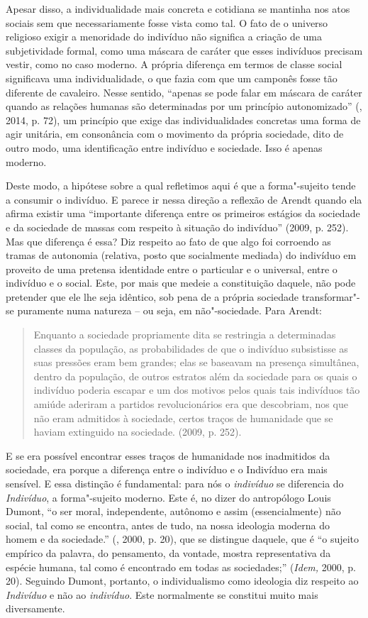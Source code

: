 Apesar disso, a individualidade mais concreta e cotidiana se mantinha
nos atos sociais sem que necessariamente fosse vista como tal. O fato de
o universo religioso exigir a menoridade do indivíduo não significa a
criação de uma subjetividade formal, como uma máscara de caráter que
esses indivíduos precisam vestir, como no caso moderno. A própria
diferença em termos de classe social significava uma individualidade, o
que fazia com que um camponês fosse tão diferente de cavaleiro. Nesse
sentido, ``apenas se pode falar em máscara de caráter quando as relações
humanas são determinadas por um princípio autonomizado'' (, 2014, p.
72), um princípio que exige das individualidades concretas uma forma de
agir unitária, em consonância com o movimento da própria sociedade, dito
de outro modo, uma identificação entre indivíduo e sociedade. Isso é
apenas moderno.

Deste modo, a hipótese sobre a qual refletimos aqui é que a
forma"-sujeito tende a consumir o indivíduo. E parece ir nessa direção a
reflexão de Arendt quando ela afirma existir uma ``importante diferença
entre os primeiros estágios da sociedade e da sociedade de massas com
respeito à situação do indivíduo'' (2009, p. 252). Mas que diferença é
essa? Diz respeito ao fato de que algo foi corroendo as tramas de
autonomia (relativa, posto que socialmente mediada) do indivíduo em
proveito de uma pretensa identidade entre o particular e o universal,
entre o indivíduo e o social. Este, por mais que medeie a constituição
daquele, não pode pretender que ele lhe seja idêntico, sob pena de a
própria sociedade transformar"-se puramente numa natureza -- ou seja, em
não"-sociedade. Para Arendt:

\begin{quote}
Enquanto a sociedade propriamente dita se restringia a determinadas
classes da população, as probabilidades de que o indivíduo subsistisse
as suas pressões eram bem grandes; elas se baseavam na presença
simultânea, dentro da população, de outros estratos além da sociedade
para os quais o indivíduo poderia escapar e um dos motivos pelos quais
tais indivíduos tão amiúde aderiram a partidos revolucionários era que
descobriam, nos que não eram admitidos à sociedade, certos traços de
humanidade que se haviam extinguido na sociedade. (2009, p. 252).
\end{quote}

E se era possível encontrar esses traços de humanidade nos inadmitidos
da sociedade, era porque a diferença entre o indivíduo e o Indivíduo era
mais sensível. E essa distinção é fundamental: para nós o
\emph{indivíduo} se diferencia do \emph{Indivíduo}, a forma"-sujeito
moderno. Este é, no dizer do antropólogo Louis Dumont, ``o ser moral,
independente, autônomo e assim (essencialmente) não social, tal como se
encontra, antes de tudo, na nossa ideologia moderna do homem e da
sociedade.'' (, 2000, p. 20), que se distingue daquele, que é ``o
sujeito empírico da palavra, do pensamento, da vontade, mostra
representativa da espécie humana, tal como é encontrado em todas as
sociedades;'' (\emph{Idem,} 2000, p. 20). Seguindo Dumont, portanto, o
individualismo como ideologia diz respeito ao \emph{Indivíduo} e não ao
\emph{indivíduo}. Este normalmente se constitui muito mais diversamente.

